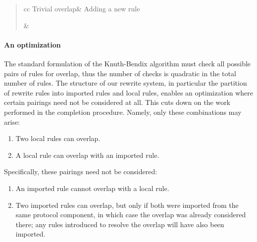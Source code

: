 \documentclass[../generics]{subfiles}
\begin{document}
\begin{quote}
\begin{tabular}{cc}
Trivial overlap&
Adding a new rule\\
&
\end{tabular}
\end{quote}

\paragraph{An optimization}
The standard formulation of the Knuth-Bendix algorithm must check all possible pairs of rules for overlap, thus the number of checks is quadratic in the total number of rules. The structure of our rewrite system, in particular the partition of rewrite rules into imported rules and local rules, enables an optimization where certain pairings need not be considered at all. This cuts down on the work performed in the completion procedure. Namely, only these combinations may arise:
\begin{enumerate}
\item Two local rules can overlap.
\item A local rule can overlap with an imported rule.
\end{enumerate}
Specifically, these pairings need not be considered:
\begin{enumerate}
\item An imported rule cannot overlap with a local rule.
\item Two imported rules can overlap, but only if both were imported from the same protocol component, in which case the overlap was already considered there; any rules introduced to resolve the overlap will have also been imported.
\end{enumerate}
\end{document}
